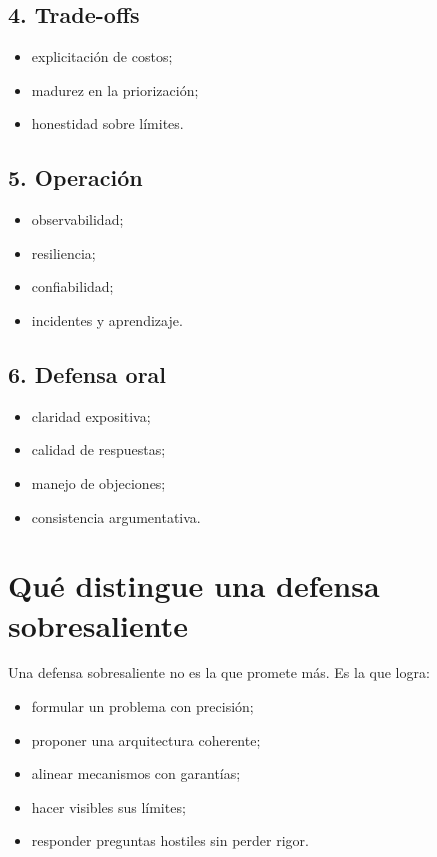 \documentclass[variant=apuntes,cover=institutional,mode=screen]{ua-engineering-v6-article}
\begin{document}
\subsection{4. Trade-offs}
\begin{itemize}
\item explicitación de costos;
\item madurez en la priorización;
\item honestidad sobre límites.
\end{itemize}

\subsection{5. Operación}
\begin{itemize}
\item observabilidad;
\item resiliencia;
\item confiabilidad;
\item incidentes y aprendizaje.
\end{itemize}

\subsection{6. Defensa oral}
\begin{itemize}
\item claridad expositiva;
\item calidad de respuestas;
\item manejo de objeciones;
\item consistencia argumentativa.
\end{itemize}

\section{Qué distingue una defensa sobresaliente}

Una defensa sobresaliente no es la que promete más. Es la que logra:
\begin{itemize}
\item formular un problema con precisión;
\item proponer una arquitectura coherente;
\item alinear mecanismos con garantías;
\item hacer visibles sus límites;
\item responder preguntas hostiles sin perder rigor.
\end{itemize}
\end{document}
